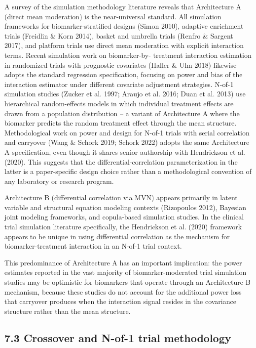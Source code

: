 \documentclass[11pt]{article}
\begin{document}
A survey of the simulation methodology literature reveals that
Architecture A (direct mean moderation) is the near-universal
standard. All simulation frameworks for biomarker-stratified
designs (Simon 2010), adaptive enrichment trials (Freidlin \&
Korn 2014), basket and umbrella trials (Renfro \& Sargent 2017),
and platform trials use direct mean moderation with explicit
interaction terms. Recent simulation work on biomarker-by-
treatment interaction estimation in randomized trials with
prognostic covariates (Haller \& Ulm 2018) likewise adopts the
standard regression specification, focusing on power and bias
of the interaction estimator under different covariate
adjustment strategies. N-of-1 simulation studies (Zucker et al.
1997; Araujo et al. 2016; Duan et al. 2013) use hierarchical
random-effects models in which individual treatment effects are
drawn from a population distribution -- a variant of
Architecture A where the biomarker predicts the random
treatment effect through the mean structure. Methodological
work on power and design for N-of-1 trials with serial
correlation and carryover (Wang \& Schork 2019; Schork 2022)
adopts the same Architecture A specification, even though it
shares senior authorship with Hendrickson et al. (2020). This
suggests that the differential-correlation parameterization in
the latter is a paper-specific design choice rather than a
methodological convention of any laboratory or research program.

Architecture B (differential correlation via MVN) appears
primarily in latent variable and structural equation modeling
contexts (Rizopoulos 2012), Bayesian joint modeling frameworks,
and copula-based simulation studies. In the clinical trial
simulation literature specifically, the Hendrickson et al.
(2020) framework appears to be unique in using differential
correlation as the mechanism for biomarker-treatment
interaction in an N-of-1 trial context.

This predominance of Architecture A has an important implication:
the power estimates reported in the vast majority of
biomarker-moderated trial simulation studies may be optimistic
for biomarkers that operate through an Architecture B mechanism,
because these studies do not account for the additional power
loss that carryover produces when the interaction signal resides
in the covariance structure rather than the mean structure.

\subsection{7.3 Crossover and N-of-1 trial methodology}
\end{document}
